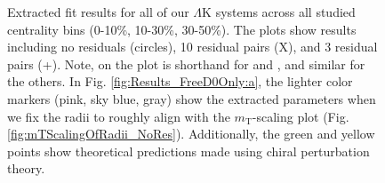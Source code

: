 \documentclass[../AnalysisNoteJBuxton.tex]{subfiles}
\begin{document}
\begin{figure}[h!]
  \caption[Fit Results]{Extracted fit results for all of our $\Lambda$K systems across all studied centrality bins (0-10\%, 10-30\%, 30-50\%).  The plots show results including no residuals (circles), 10 residual pairs (X), and 3 residual pairs (+).  Note, \LamKchP on the plot is shorthand for \LamKchP and \ALamKchM, and similar for the others.  In Fig. \ref{fig:Results_FreeD0Only:a}, the lighter color markers (pink, sky blue, gray) show the extracted parameters when we fix the radii to roughly align with the $m_{\mathrm{T}}$-scaling plot (Fig. \ref{fig:mTScalingOfRadii_NoRes}).  Additionally, the green \cite{Liu:2006xja} and yellow \cite{Mai:2009ce} points show theoretical predictions made using chiral perturbation theory.}
  \label{fig:Results_FreeD0Only}
\end{figure}


\clearpage





\end{document}
